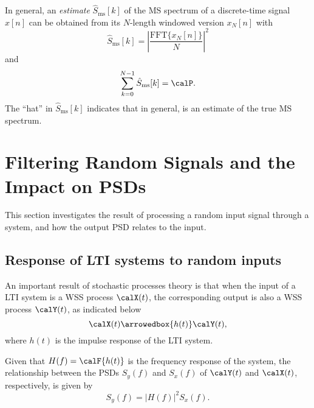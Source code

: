 In general, an \emph{estimate} $\hat S_{\textrm{ms}}[k]$ of the MS spectrum of a discrete-time signal $x[n]$ can be obtained from its $N$-length windowed version $x_N[n]$ with
\begin{equation}
\hat S_{\textrm{ms}}[k] = \left| \frac{\textrm{FFT}\{x_N[n]\}}{N}\right|^2
\label{eq:msEstimationViaFFT}
\end{equation}
and
\begin{equation}
\sum_{k=0}^{N-1} \hat S_{\textrm{ms}}[k] = \calP.
\label{eq:ms_sumPower}
\end{equation}
The ``hat'' in $\hat S_{\textrm{ms}}[k]$ indicates that in general,  is an estimate of the true MS spectrum.


\section{Filtering Random Signals and the Impact on PSDs}

This section investigates the result of processing a random input signal through a system, and how the output
PSD relates to the input.

\subsection{Response of LTI systems to random inputs}
\label{sec:randomLTIInput}

An important result of stochastic processes theory is that when the input of a LTI system is a WSS process $\calX(t)$, the corresponding output is also a WSS process $\calY(t)$, as indicated below
\[
\calX(t) \arrowedbox{h(t)}  \calY(t),
\]
where $h(t)$ is the impulse response of the LTI system. 

Given that $H(f) = \calF \{ h(t) \}$ is the frequency response of the system, the relationship between the PSDs $S_y(f)$ and $S_x(f)$ of $\calY(t)$ and $\calX(t)$, respectively, is given by
\begin{equation}
S_y(f)=|H(f)|^2 S_x(f).
\label{eq:wss_continuous_lti_output_psd}
\end{equation}

